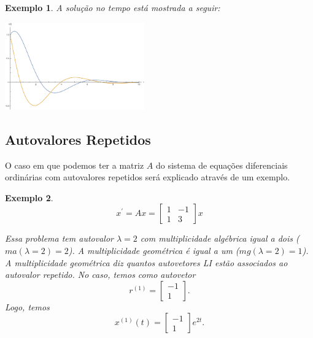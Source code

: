\documentclass[a4paper,portuguese,9pt,final]{extarticle}
\newtheorem{example}{Exemplo}[section]
\begin{document}
\begin{multicols*}{2}
\begin{example}
                 A solução no tempo está mostrada a seguir:
                 
                 \includegraphics[width=0.45\textwidth]{tempo_1}
                
            \end{example}
            
        \columnbreak    
            
        \subsection{Autovalores Repetidos}
        
        
            O caso em que podemos ter a matriz $A$ do sistema de equações diferenciais ordinárias com autovalores repetidos será explicado através de um exemplo.
            
            \begin{example}
                \begin{equation*}
                      x^\prime = Ax = \begin{bmatrix}
                                     1 & -1\\
                                     1& 3
                                     \end{bmatrix} x 
                \end{equation*}
                
                Essa problema tem autovalor $\lambda = 2$ com multiplicidade algébrica igual a dois ($ma(\lambda = 2)= 2$). A multiplicidade geométrica é igual a um ($mg(\lambda = 2) = 1$). A multiplicidade geométrica diz quantos autovetores LI estão associados ao autovalor repetido. No caso, temos como autovetor $$r^{(1)} = \begin{bmatrix} -1 \\ 1 \end{bmatrix}.$$ Logo, temos $$x^{(1)}(t) = \begin{bmatrix} -1\\ 1 \end{bmatrix}e^{2t}.$$
                

\end{example}
\end{multicols*}
\end{document}
